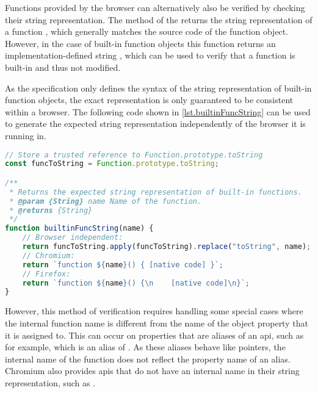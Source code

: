 Functions provided by the browser can alternatively also be verified by checking their string representation. The  method of the  returns the string representation of a function \cite{ECMA262}, which generally matches the source code of the function object. However, in the case of built-in function objects this function returns an implementation-defined string \cite{ECMA262}, which can be used to verify that a function is built-in and thus not modified.

As the specification only defines the syntax of the string representation of built-in function objects, the exact representation is only guaranteed to be consistent within a browser. The following code shown in \autoref{lst.builtinFuncString} can be used to generate the expected string representation independently of the browser it is running in.

\begin{lstlisting}[language=JavaScript,showstringspaces=true,label={lst.builtinFuncString},caption={Generating the expected string representation of built-in function objects}]
// Store a trusted reference to Function.prototype.toString
const funcToString = Function.prototype.toString;

/**
 * Returns the expected string representation of built-in functions.
 * @param {String} name Name of the function.
 * @returns {String}
 */
function builtinFuncString(name) {
    // Browser independent:
    return funcToString.apply(funcToString).replace("toString", name);
    // Chromium:
    return `function ${name}() { [native code] }`;
    // Firefox:
    return `function ${name}() {\n    [native code]\n}`;
}
\end{lstlisting}

However, this method of verification requires handling some special cases where the internal function name is different from the name of the  object property that it is assigned to. This can occur on properties that are aliases of an \ac{api}, such as  for example, which is an alias of . As these aliases behave like pointers, the internal name of the function does not reflect the property name of an alias. Chromium also provides \acp{api} that do not have an internal name in their string representation, such as .

